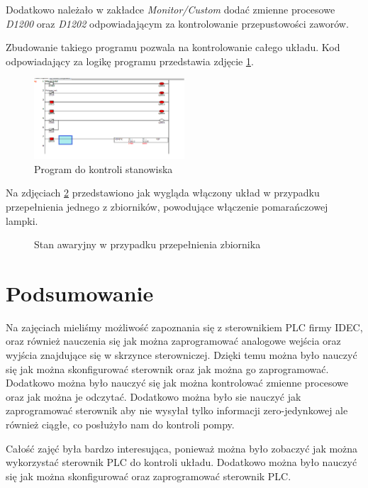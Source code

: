 \documentclass{article}
\begin{document}
Dodatkowo należało w zakładce \textit{Monitor/Custom} dodać zmienne procesowe \textit{D1200} oraz \textit{D1202} odpowiadającym za kontrolowanie przepustowości zaworów.

Zbudowanie takiego programu pozwala na kontrolowanie całego układu. Kod odpowiadający za logikę programu przedstawia zdjęcie \ref{fig:zdj11}.

\begin{figure}[H]
    \centering
    \includegraphics[width=0.5\textwidth]{media/2_2_Giga_mega_układ.png}
    \caption{Program do kontroli stanowiska}
    \label{fig:zdj11}
\end{figure}

Na zdjęciach \ref{fig:main2} przedstawiono jak wygląda włączony układ w przypadku przepełnienia jednego z zbiorników, powodujące włączenie pomarańczowej lampki. 

\begin{figure}[H]
    \centering
    \caption{Stan awaryjny w przypadku przepełnienia zbiornika}
    \label{fig:main2}
\end{figure}

\newpage
\section{Podsumowanie}
Na zajęciach mieliśmy możliwość zapoznania się z sterownikiem PLC firmy IDEC, oraz również nauczenia się jak można zaprogramować analogowe wejścia oraz wyjścia znajdujące się w skrzynce sterowniczej.
Dzięki temu można było nauczyć się jak można skonfigurować sterownik oraz jak można go zaprogramować. Dodatkowo można było nauczyć się jak można kontrolować zmienne procesowe oraz jak można je odczytać.
Dodatkowo można było sie nauczyć jak zaprogramować sterownik aby nie wysyłał tylko informacji zero-jedynkowej ale również ciągłe, co posłużyło nam do kontroli pompy.

Całość zajęć była bardzo interesująca, ponieważ można było zobaczyć jak można wykorzystać sterownik PLC do kontroli układu. Dodatkowo można było nauczyć się jak można skonfigurować oraz zaprogramować sterownik PLC.
\end{document}
